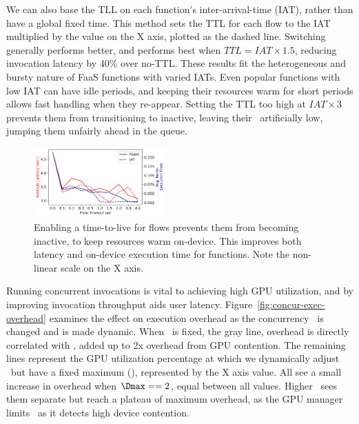 We can also base the TLL on each function's inter-arrival-time (IAT), rather than have a global fixed time.
This method sets the TTL for each flow to the IAT multiplied by the value on the X axis, plotted as the dashed line.
Switching generally performs better, and performs best when $TTL = IAT \times 1.5$, reducing invocation latency by 40\% over no-TTL.
These results fit the heterogeneous and bursty nature of FaaS functions with varied IATs.
Even popular functions with low IAT can have idle periods, and keeping their resources warm for short periods allows fast handling when they re-appear.
Setting the TTL too high at $IAT \times 3$ prevents them from transitioning to inactive, leaving their \VT~artificially low, jumping them unfairly ahead in the queue.

\begin{figure}
  \includegraphics[width=0.45\textwidth]{../graphs/ttl/25.8/mqfq-ttl-compare.pdf}
  \vspace*{\captionspace}
  \caption{Enabling a time-to-live for flows prevents them from becoming inactive, to keep resources warm on-device. 
    This improves both latency and on-device execution time for functions.
    Note the non-linear scale on the X axis.}
    \label{fig:flow-ttl}
  \vspace{-0.5cm}
\end{figure}


Running concurrent invocations is vital to achieving high GPU utilization, and by improving invocation throughput aids user latency.
Figure~\ref{fig:concur-exec-overhead} examines the effect on execution overhead as the concurrency \D~is changed and is made dynamic.
When \D~is fixed, the gray line, overhead is directly correlated with \D, added up to 2x overhead from GPU contention.
The remaining lines represent the GPU utilization percentage at which we dynamically adjust \D~but have a fixed maximum (\Dmax), represented by the X axis value.
All see a small increase in overhead when $\Dmax==2$, equal between all values.
Higher \Dmax~sees them separate but reach a plateau of maximum overhead, as the GPU manager limits \D~as it detects high device contention.

